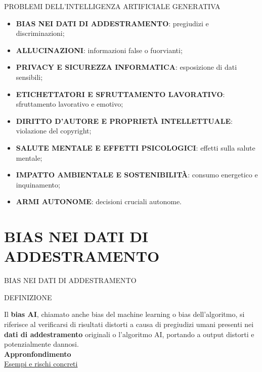 \documentclass[aspectratio=1610]{beamer}
\begin{document}
\begin{frame}{PROBLEMI DELL'INTELLIGENZA ARTIFICIALE GENERATIVA}
    \begin{itemize}
        \item \textbf{BIAS NEI DATI DI ADDESTRAMENTO}: pregiudizi e discriminazioni;
        \pause
        \item \textbf{ALLUCINAZIONI}: informazioni false o fuorvianti;
        \pause
        \item \textbf{PRIVACY E SICUREZZA INFORMATICA}: esposizione di dati sensibili;
        \pause
        \item \textbf{ETICHETTATORI E SFRUTTAMENTO LAVORATIVO}: sfruttamento lavorativo e emotivo;
        \pause
        \item \textbf{DIRITTO D'AUTORE E PROPRIETÀ INTELLETTUALE}: violazione del copyright;
        \pause
        \item \textbf{SALUTE MENTALE E EFFETTI PSICOLOGICI}: effetti sulla salute mentale;
        \pause
        \item \textbf{IMPATTO AMBIENTALE E SOSTENIBILITÀ}: consumo energetico e inquinamento;
        \pause
        \item \textbf{ARMI AUTONOME}: decisioni cruciali autonome.
    \end{itemize}
\end{frame}

\section{BIAS NEI DATI DI ADDESTRAMENTO}

\begin{frame}{BIAS NEI DATI DI ADDESTRAMENTO}
    \begin{alertblock}{DEFINIZIONE}
        \begin{minipage}{0.96\linewidth}
            \justifying
            Il \textbf{bias AI}, chiamato anche bias del machine learning o bias dell'algoritmo, 
            si riferisce al verificarsi di risultati distorti a causa di pregiudizi 
            umani presenti nei \textbf{dati di addestramento} originali o l'algoritmo AI, portando 
            a output distorti e potenzialmente dannosi.\\
            \bigskip
            \tiny{\textbf{Appronfondimento}}\\
            \tiny{\href{https://www.ibm.com/it-it/think/topics/ai-bias}{Esempi e rischi concreti}}
        \end{minipage}
    \end{alertblock}
\end{frame}
\end{document}
